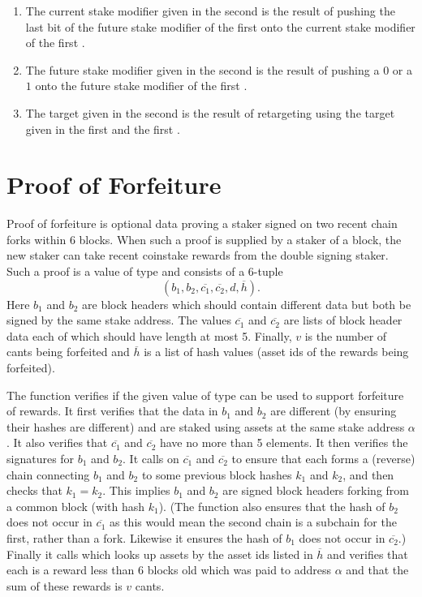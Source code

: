 \begin{itemize}
\begin{enumerate}
\item The current stake modifier given in the second {}
 is the result of pushing the last bit of the future stake modifier of the first {}
 onto the current stake modifier of the first {}.
\item The future stake modifier given in the second {}
      is the result of pushing a $0$ or a $1$ onto the future stake modifier of the first {}.
\item The target given in the second {} is the result of retargeting using
      the target given in the first {}
      and the first {}.
\end{enumerate}
\end{itemize}

\section{Proof of Forfeiture}

Proof of forfeiture is
optional data proving a staker signed on two recent chain forks within 6 blocks.
When such a proof is supplied by a staker of a block, the new staker can
take recent coinstake rewards from the double signing staker.
Such a proof is a value of type {}
and consists of a 6-tuple
$$(b_1,b_2,\overline{c_1},\overline{c_2},d,\overline{h}).$$
Here $b_1$ and $b_2$ are block headers which should contain different data but both be signed by the
same stake address.
The values $\overline{c_1}$ and $\overline{c_2}$ are lists of block header data
each of which should have length at most 5.
Finally, $v$ is the number of cants being forfeited
and $\overline{h}$ is a list of hash values (asset ids of the rewards being forfeited).

The function {} verifies if the given value of type {}
can be used to support forfeiture of rewards. It first verifies that the data in $b_1$ and $b_2$
are different (by ensuring their hashes are different)
and
are staked using assets at the same stake address $\alpha$.
It also verifies that $\overline{c_1}$
and $\overline{c_2}$ have no more than 5 elements.
It then verifies the signatures for $b_1$ and $b_2$.
It calls {} on $\overline{c_1}$ and $\overline{c_2}$
to ensure that each forms a (reverse) chain connecting $b_1$ and $b_2$
to some previous block hashes $k_1$ and $k_2$,
and then checks that $k_1 = k_2$. This implies $b_1$ and $b_2$ are signed block headers
forking from a common block (with hash $k_1$). (The function {} also ensures
that the hash of $b_2$ does not occur in $\overline{c_1}$ as this would mean
the second chain is a subchain for the first, rather than a fork. Likewise it ensures
the hash of $b_1$ does not occur in $\overline{c_2}$.)
Finally it calls {}
which looks up assets by the asset ids listed in $\overline{h}$
and verifies that each is a reward less than 6 blocks old
which was paid to address $\alpha$
and that the sum of these rewards is $v$ cants.

